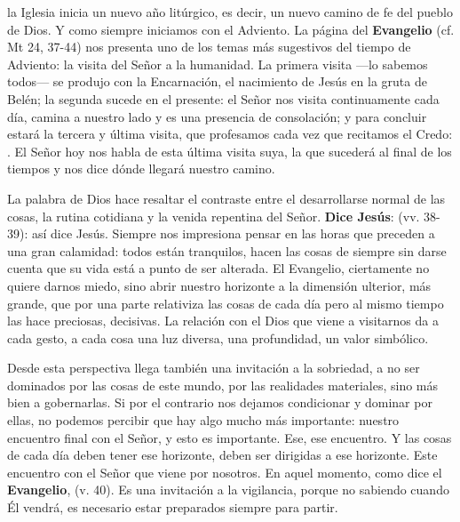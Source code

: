 \begin{body}
	 la Iglesia inicia un nuevo año litúrgico, es decir, un nuevo camino de fe del pueblo de Dios. Y como siempre iniciamos con el Adviento. La página del \textbf{Evangelio} (cf. Mt 24, 37-44) nos presenta uno de los temas más sugestivos del tiempo de Adviento: la visita del Señor a la humanidad. La primera visita ---lo sabemos todos--- se produjo con la Encarnación, el nacimiento de Jesús en la gruta de Belén; la segunda sucede en el presente: el Señor nos visita continuamente cada día, camina a nuestro lado y es una presencia de consolación; y para concluir estará la tercera y última visita, que profesamos cada vez que recitamos el Credo: . El Señor hoy nos habla de esta última visita suya, la que sucederá al final de los tiempos y nos dice dónde llegará nuestro camino. 
	
	La palabra de Dios hace resaltar el contraste entre el desarrollarse normal de las cosas, la rutina cotidiana y la venida repentina del Señor. \textbf{Dice Jesús}:  (vv. 38-39): así dice Jesús. Siempre nos impresiona pensar en las horas que preceden a una gran calamidad: todos están tranquilos, hacen las cosas de siempre sin darse cuenta que su vida está a punto de ser alterada. El Evangelio, ciertamente no quiere darnos miedo, sino abrir nuestro horizonte a la dimensión ulterior, más grande, que por una parte relativiza las cosas de cada día pero al mismo tiempo las hace preciosas, decisivas. La relación con el Dios que viene a visitarnos da a cada gesto, a cada cosa una luz diversa, una profundidad, un valor simbólico. 
	
	Desde esta perspectiva llega también una invitación a la sobriedad, a no ser dominados por las cosas de este mundo, por las realidades materiales, sino más bien a gobernarlas. Si por el contrario nos dejamos condicionar y dominar por ellas, no podemos percibir que hay algo mucho más importante: nuestro encuentro final con el Señor, y esto es importante. Ese, ese encuentro. Y las cosas de cada día deben tener ese horizonte, deben ser dirigidas a ese horizonte. Este encuentro con el Señor que viene por nosotros. En aquel momento, como dice el \textbf{Evangelio},  (v. 40). Es una invitación a la vigilancia, porque no sabiendo cuando Él vendrá, es necesario estar preparados siempre para partir. 
	

\end{body}
